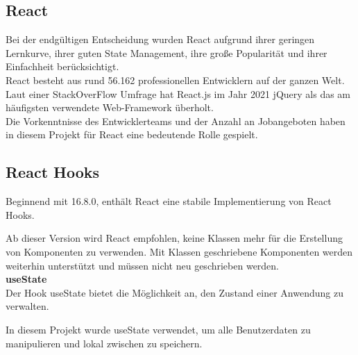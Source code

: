 


\subsection{React}
Bei der endgültigen Entscheidung wurden React aufgrund ihrer geringen Lernkurve, ihrer guten State Management, ihre große Popularität und ihrer Einfachheit berücksichtigt.
\\
React besteht aus rund 56.162 professionellen Entwicklern auf der ganzen Welt.
Laut einer StackOverFlow Umfrage hat React.js im Jahr 2021 jQuery als das am häufigsten verwendete Web-Framework überholt. {\cite{SO01}}
\\
Die Vorkenntnisse des Entwicklerteams und der Anzahl an Jobangeboten haben in diesem Projekt für React eine bedeutende Rolle gespielt.


\subsection{React Hooks}
Beginnend mit 16.8.0, enthält React eine stabile Implementierung von React Hooks.

Ab dieser Version wird React empfohlen, keine Klassen mehr für die Erstellung von Komponenten zu verwenden.
Mit Klassen geschriebene Komponenten werden weiterhin unterstützt und müssen nicht neu geschrieben werden.
  {\cite{R05}}
\\

\textbf{useState}
\\
Der Hook useState bietet die Möglichkeit an, den Zustand einer Anwendung zu verwalten. 


In diesem Projekt wurde useState verwendet, um alle Benutzerdaten zu manipulieren und lokal zwischen zu speichern.

